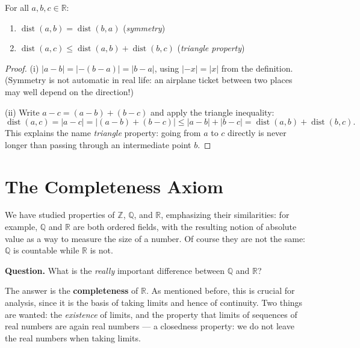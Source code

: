 \documentclass[11pt]{report}
\begin{document}
\begin{propbox}
For all $a, b, c \in \mathbb{R}$:
\begin{enumerate}[label=(\roman*)]
    \item $\operatorname{dist}(a,b) = \operatorname{dist}(b,a)$ \hfill (\emph{symmetry})
    \item $\operatorname{dist}(a,c) \leq \operatorname{dist}(a,b) + \operatorname{dist}(b,c)$ \hfill (\emph{triangle property})
\end{enumerate}
\end{propbox}

\begin{proof}
(i) $|a - b| = |-(b-a)| = |b - a|$, using $|{-x}| = |x|$ from the definition. (Symmetry is not automatic in real life: an airplane ticket between two places may well depend on the direction!)

(ii) Write $a - c = (a - b) + (b - c)$ and apply the triangle inequality:
\[
\operatorname{dist}(a,c) = |a - c| = |(a-b) + (b-c)| \leq |a - b| + |b - c| = \operatorname{dist}(a,b) + \operatorname{dist}(b,c).
\]
This explains the name \emph{triangle} property: going from $a$ to $c$ directly is never longer than passing through an intermediate point $b$.
\end{proof}


\section{The Completeness Axiom}

We have studied properties of $\mathbb{Z}$, $\mathbb{Q}$, and $\mathbb{R}$, emphasizing their similarities: for example, $\mathbb{Q}$ and $\mathbb{R}$ are both ordered fields, with the resulting notion of absolute value as a way to measure the size of a number. Of course they are not the same: $\mathbb{Q}$ is countable while $\mathbb{R}$ is not.

\textbf{Question.} What is the \emph{really} important difference between $\mathbb{Q}$ and $\mathbb{R}$?

The answer is the \textbf{completeness} of $\mathbb{R}$. As mentioned before, this is crucial for analysis, since it is the basis of taking limits and hence of continuity. Two things are wanted: the \emph{existence} of limits, and the property that limits of sequences of real numbers are again real numbers --- a closedness property: we do not leave the real numbers when taking limits.
\end{document}
